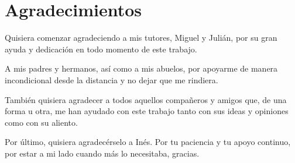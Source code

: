 

\chapter{Agradecimientos}

Quisiera comenzar agradeciendo a mis tutores, Miguel y Julián, por su gran ayuda
y dedicación en todo momento de este trabajo.
\bigskip

A mis padres y hermanos, así como a mis abuelos, por apoyarme de manera
incondicional desde la distancia y no dejar que me rindiera.
\bigskip

También quisiera agradecer a todos aquellos compañeros y amigos que, de una forma
u otra, me han ayudado con este trabajo tanto con sus ideas y opiniones como con
su aliento.
\bigskip

Por último, quisiera agradecérselo a Inés. Por tu paciencia y tu apoyo continuo,
por estar a mi lado cuando más lo necesitaba, gracias.

\cleardoublepage
\endinput